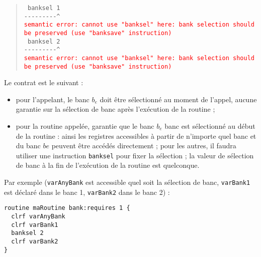 \begin{quote}
\texttt{ banksel 1}\\
\texttt{-{-}-{-}-{-}-{-}-\^}\\
\textcolor{red}{\tt semantic error: cannot use "banksel" here: bank selection should be preserved (use "banksave" instruction)}\\

\texttt{  banksel 2}\\
\texttt{-{-}-{-}-{-}-{-}-\^}\\
\textcolor{red}{\tt semantic error: cannot use "banksel" here: bank selection should be preserved (use "banksave" instruction)}
\end{quote}














Le contrat est le suivant :
\begin{itemize}
  \item pour l'appelant, le banc $b_e$ doit être sélectionné au moment de l'appel, aucune garantie sur la sélection de banc après l'exécution de la routine ; 
  \item pour la routine appelée, garantie que le banc $b_e$ banc est sélectionné au début de la routine : ainsi les registres accessibles à partir de n'importe quel banc et du banc $be$ peuvent être accédés directement ; pour les autres, il faudra utiliser une instruction \texttt{banksel} pour fixer la sélection ; la valeur de sélection de banc à la fin de l'exécution de la routine est quelconque.
\end{itemize}

Par exemple (\texttt{varAnyBank} est accessible quel soit la sélection de banc, \texttt{varBank1} est déclaré dans le banc 1, \texttt{varBank2} dans le banc 2) :
\begin{lstlisting}[language=piccolo]
routine maRoutine bank:requires 1 {
  clrf varAnyBank
  clrf varBank1
  banksel 2
  clrf varBank2
}
\end{lstlisting}









